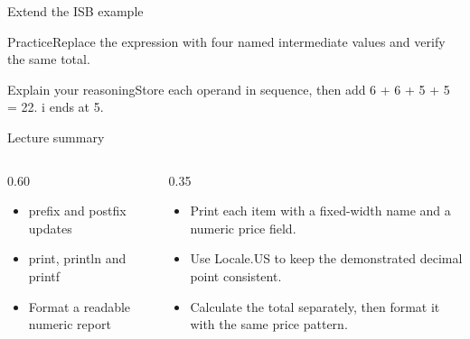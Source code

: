 \documentclass[10pt,aspectratio=169]{beamer}
\begin{document}
\begin{frame}[fragile,t]{Extend the ISB example}
\begin{alertblock}{Practice}Replace the expression with four named intermediate values and verify the same total.\end{alertblock}\vspace{3mm}\begin{exampleblock}{Explain your reasoning}Store each operand in sequence, then add 6 + 6 + 5 + 5 = 22. i ends at 5.\end{exampleblock}
\end{frame}
\begin{frame}[fragile,t]{Lecture summary}
\begin{columns}[T,onlytextwidth]\begin{column}{0.60\textwidth}
\begin{itemize}
\item prefix and postfix updates
\item print, println and printf
\item Format a readable numeric report
\end{itemize}
\end{column}\begin{column}{0.35\textwidth}\small
\begin{itemize}
\item Print each item with a fixed-width name and a numeric price field.
\item Use Locale.US to keep the demonstrated decimal point consistent.
\item Calculate the total separately, then format it with the same price pattern.
\end{itemize}
\end{column}\end{columns}
\end{frame}
\end{document}
